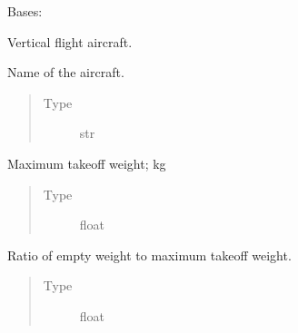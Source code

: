 \documentclass[letterpaper,10pt,english]{sphinxmanual}
\begin{document}
\begin{fulllineitems}
\label{\detokenize{modules/aircraft:aircraft.Aircraft}}
\sphinxAtStartPar
Bases: 

\sphinxAtStartPar
Vertical flight aircraft.

\begin{fulllineitems}
\label{\detokenize{modules/aircraft:aircraft.Aircraft.name}}
\sphinxAtStartPar
Name of the aircraft.
\begin{quote}\begin{description}
\item[{Type}] \leavevmode
\sphinxAtStartPar
str

\end{description}\end{quote}

\end{fulllineitems}


\begin{fulllineitems}
\label{\detokenize{modules/aircraft:aircraft.Aircraft.mtow}}
\sphinxAtStartPar
Maximum take\sphinxhyphen{}off weight; kg
\begin{quote}\begin{description}
\item[{Type}] \leavevmode
\sphinxAtStartPar
float

\end{description}\end{quote}

\end{fulllineitems}


\begin{fulllineitems}
\label{\detokenize{modules/aircraft:aircraft.Aircraft.empty_weight_ratio}}
\sphinxAtStartPar
Ratio of empty weight to maximum take\sphinxhyphen{}off weight.
\begin{quote}\begin{description}
\item[{Type}] \leavevmode
\sphinxAtStartPar
float


\end{description}
\end{quote}
\end{fulllineitems}
\end{fulllineitems}
\end{document}
